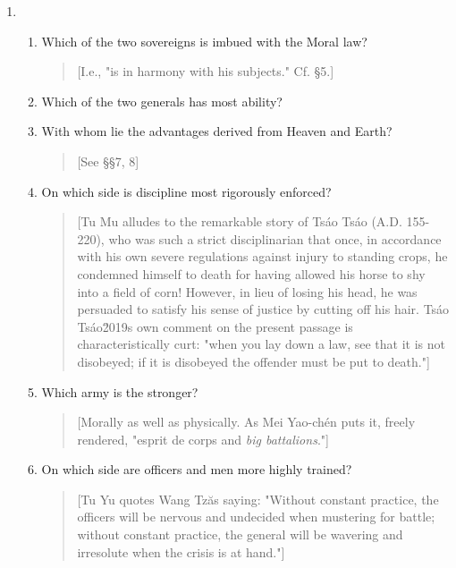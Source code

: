 \documentclass[10pt,a4paper]{book}
\begin{document}
\begin{enumerate}[leftmargin=*, label=\arabic*.,wide=0pt, resume]

\item \begin{enumerate}[label=(\arabic*), leftmargin=2em, wide=0pt]

\item Which of the two sovereigns is imbued with the Moral law?

{\small
\begin{quote}
[I.e., "is in harmony with his subjects." Cf. \S 5.]
\end{quote}
}

\item Which of the two generals has most ability?

\item With whom lie the advantages derived from Heaven and Earth?

{\small
\begin{quote}
[See \S\S 7, 8]
\end{quote}
}

\item On which side is discipline most rigorously enforced?

{\small
\begin{quote}
[Tu Mu alludes to the remarkable story of Ts\'ao Ts\'ao (A.D. 155-220), who was such a strict disciplinarian that once, in accordance with his own severe regulations against injury to standing crops, he condemned himself to death for having allowed his horse to shy into a field of corn! However, in lieu of losing his head, he was persuaded to satisfy his sense of justice by cutting off his hair. Ts\'ao Ts\'ao\u2019s own comment on the present passage is characteristically curt: "when you lay down a law, see that it is not disobeyed; if it is disobeyed the offender must be put to death."]
\end{quote}
}

\item Which army is the stronger?

{\small
\begin{quote}
[Morally as well as physically. As Mei Yao-ch\'en puts it, freely rendered, "esprit de corps and \textit{big battalions}."]
\end{quote}
}

\item On which side are officers and men more highly trained?

{\small
\begin{quote}
[Tu Yu quotes Wang Tz\u as saying: "Without constant practice, the officers will be nervous and undecided when mustering for battle; without constant practice, the general will be wavering and irresolute when the crisis is at hand."]
\end{quote}
}


\end{enumerate}
\end{enumerate}
\end{document}

